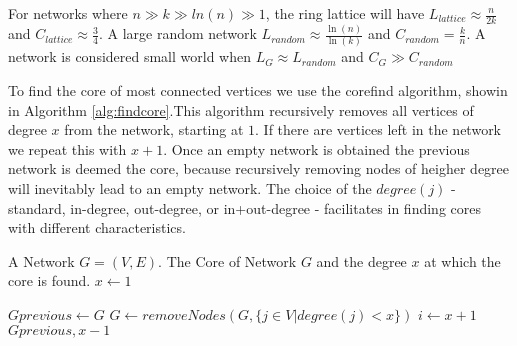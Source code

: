 For networks where $n\gg k\gg ln(n) \gg1$, the ring lattice will have $L_{lattice}\approx\frac{n}{2k}$ and $C_{lattice}\approx\frac{3}{4}$.
A large random network  $ L_{random}\approx\frac{\ln(n)}{\ln(k)}$ and $C_{random}=\frac{k}{n}$. A network is considered small world when $L_G\approx L_{random}$ and $C_G \gg C_{random}$

To find the core of most connected vertices we use the corefind algorithm, showin in Algorithm \ref{alg:findcore}.This algorithm recursively removes all vertices of degree $x$ from the network, starting at $1$. If there are vertices left in the network we repeat this with $x+1$. Once an empty network is obtained the previous network is deemed the core, because recursively removing nodes of heigher degree will inevitably lead to an empty network. The choice of the $degree(j)$ - standard, in-degree, out-degree,  or in+out-degree - facilitates in finding cores with different characteristics.

\newcommand{\FindCore}{\ensuremath{\mbox{\sc FindCore}}}
\begin{algorithm}[h!]
\caption{$\FindCore(Network)$}\label{alg:findcore}
\begin{algorithmic}
\REQUIRE A Network $G=(V,E)$.
\ENSURE The Core of Network $G$ and the degree $x$ at which the core is found.
\medskip
\STATE $x\gets 1$
	
	\STATE $Gprevious \gets G$
		\STATE $G\gets removeNodes(G, \{j\in V | degree(j)<x\})$ 
	\ENDWHILE
	\STATE $i \gets x+1$
\ENDWHILE
\RETURN $Gprevious, x-1$
\end{algorithmic}
\end{algorithm}

%
